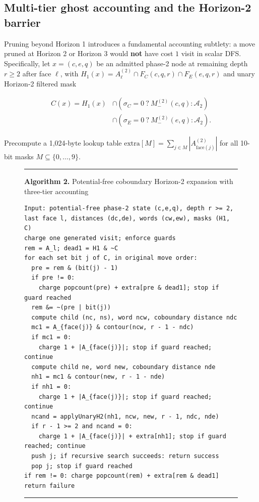 \documentclass[10pt,twocolumn,letterpaper]{article}
\begin{document}
\hypertarget{multi-tier-ghost-accounting-and-the-horizon-2-barrier}{%
\subsection{Multi-tier ghost accounting and the Horizon-2 barrier}\label{multi-tier-ghost-accounting-and-the-horizon-2-barrier}}

Pruning beyond Horizon 1 introduces a fundamental accounting subtlety: a
move pruned at Horizon 2 or Horizon 3 would \textbf{not} have cost \(1\)
visit in scalar DFS. Specifically, let \(x=(c,e,q)\) be an admitted
phase-2 node at remaining depth \(r \ge 2\) after face \(\ell\), with
\(H_1(x) = A_\ell^{(2)} \cap F_C(c,q,r) \cap F_E(e,q,r)\) and unary
Horizon-2 filtered mask

\[
\begin{aligned}
C(x) = H_1(x) &\cap (\sigma_C = 0 \ ? \ M_-^{(2)}(c,q) : \mathcal A_2)\\
&\cap (\sigma_E = 0 \ ? \ M_-^{(2)}(e,q) : \mathcal A_2).
\end{aligned}
\tag{10}
\]

Precompute a 1,024-byte lookup table
\(\text{extra}[M] = \sum_{j \in M} |A_{\text{face}(j)}^{(2)}|\) for all
10-bit masks \(M \subseteq \{0,\dots,9\}\).

\begin{figure}[t]
\hrule\vspace{5pt}
\textbf{Algorithm 2.} Potential-free coboundary Horizon-2 expansion with three-tier accounting
\vspace{4pt}
\begin{Verbatim}[fontsize=\footnotesize,breaklines=true,breakanywhere=true]
Input: potential-free phase-2 state (c,e,q), depth r >= 2, last face l, distances (dc,de), words (cw,ew), masks (H1, C)
charge one generated visit; enforce guards
rem = A_l; dead1 = H1 & ~C
for each set bit j of C, in original move order:
  pre = rem & (bit(j) - 1)
  if pre != 0:
    charge popcount(pre) + extra[pre & dead1]; stop if guard reached
  rem &= ~(pre | bit(j))
  compute child (nc, ns), word ncw, coboundary distance ndc
  mc1 = A_{face(j)} & contour(ncw, r - 1 - ndc)
  if mc1 = 0:
    charge 1 + |A_{face(j)}|; stop if guard reached; continue
  compute child ne, word new, coboundary distance nde
  nh1 = mc1 & contour(new, r - 1 - nde)
  if nh1 = 0:
    charge 1 + |A_{face(j)}|; stop if guard reached; continue
  ncand = applyUnaryH2(nh1, ncw, new, r - 1, ndc, nde)
  if r - 1 >= 2 and ncand = 0:
    charge 1 + |A_{face(j)}| + extra[nh1]; stop if guard reached; continue
  push j; if recursive search succeeds: return success
  pop j; stop if guard reached
if rem != 0: charge popcount(rem) + extra[rem & dead1]
return failure
\end{Verbatim}
\vspace{3pt}\hrule
\end{figure}
\end{document}
